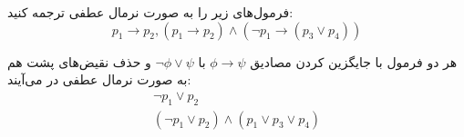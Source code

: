 فرمول‌های زیر را به صورت نرمال عطفی ترجمه کنید:
$$p_1\to p_2, (p_1\to p_2)\wedge (\neg p_1\to (p_3\vee p_4))$$
\begin{ans}
    هر دو فرمول با جایگزین کردن مصادیق
    $\phi\to\psi$
    با
    $\neg\phi\vee\psi$
    و حذف نقیض‌های پشت هم به صورت نرمال عطفی در می‌آیند:
    \begin{gather*}
        \neg p_1\vee p_2 \\
        (\neg p_1\vee p_2)\wedge (p_1\vee p_3\vee p_4)
    \end{gather*}
\end{ans}